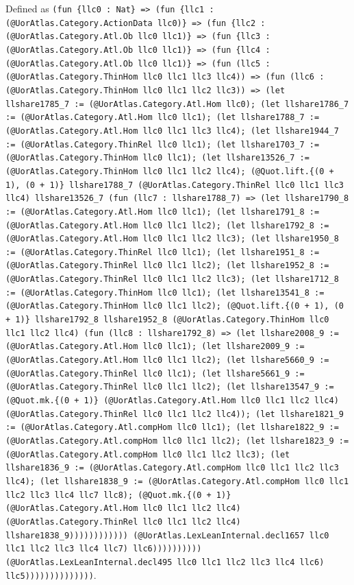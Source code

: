 \documentclass[11pt]{article}
\begin{document}
\noindent Defined as \texttt{(fun \{llc0 : Nat\} => (fun \{llc1 : (@UorAtlas.Category.ActionData llc0)\} => (fun \{llc2 : (@UorAtlas.Category.Atl.Ob llc0 llc1)\} => (fun \{llc3 : (@UorAtlas.Category.Atl.Ob llc0 llc1)\} => (fun \{llc4 : (@UorAtlas.Category.Atl.Ob llc0 llc1)\} => (fun (llc5 : (@UorAtlas.Category.ThinHom llc0 llc1 llc3 llc4)) => (fun (llc6 : (@UorAtlas.Category.ThinHom llc0 llc1 llc2 llc3)) => (let llshare1785\_7 := (@UorAtlas.Category.Atl.Hom llc0); (let llshare1786\_7 := (@UorAtlas.Category.Atl.Hom llc0 llc1); (let llshare1788\_7 := (@UorAtlas.Category.Atl.Hom llc0 llc1 llc3 llc4); (let llshare1944\_7 := (@UorAtlas.Category.ThinRel llc0 llc1); (let llshare1703\_7 := (@UorAtlas.Category.ThinHom llc0 llc1); (let llshare13526\_7 := (@UorAtlas.Category.ThinHom llc0 llc1 llc2 llc4); (@Quot.lift.\{(0 + 1), (0 + 1)\} llshare1788\_7 (@UorAtlas.Category.ThinRel llc0 llc1 llc3 llc4) llshare13526\_7 (fun (llc7 : llshare1788\_7) => (let llshare1790\_8 := (@UorAtlas.Category.Atl.Hom llc0 llc1); (let llshare1791\_8 := (@UorAtlas.Category.Atl.Hom llc0 llc1 llc2); (let llshare1792\_8 := (@UorAtlas.Category.Atl.Hom llc0 llc1 llc2 llc3); (let llshare1950\_8 := (@UorAtlas.Category.ThinRel llc0 llc1); (let llshare1951\_8 := (@UorAtlas.Category.ThinRel llc0 llc1 llc2); (let llshare1952\_8 := (@UorAtlas.Category.ThinRel llc0 llc1 llc2 llc3); (let llshare1712\_8 := (@UorAtlas.Category.ThinHom llc0 llc1); (let llshare13541\_8 := (@UorAtlas.Category.ThinHom llc0 llc1 llc2); (@Quot.lift.\{(0 + 1), (0 + 1)\} llshare1792\_8 llshare1952\_8 (@UorAtlas.Category.ThinHom llc0 llc1 llc2 llc4) (fun (llc8 : llshare1792\_8) => (let llshare2008\_9 := (@UorAtlas.Category.Atl.Hom llc0 llc1); (let llshare2009\_9 := (@UorAtlas.Category.Atl.Hom llc0 llc1 llc2); (let llshare5660\_9 := (@UorAtlas.Category.ThinRel llc0 llc1); (let llshare5661\_9 := (@UorAtlas.Category.ThinRel llc0 llc1 llc2); (let llshare13547\_9 := (@Quot.mk.\{(0 + 1)\} (@UorAtlas.Category.Atl.Hom llc0 llc1 llc2 llc4) (@UorAtlas.Category.ThinRel llc0 llc1 llc2 llc4)); (let llshare1821\_9 := (@UorAtlas.Category.Atl.compHom llc0 llc1); (let llshare1822\_9 := (@UorAtlas.Category.Atl.compHom llc0 llc1 llc2); (let llshare1823\_9 := (@UorAtlas.Category.Atl.compHom llc0 llc1 llc2 llc3); (let llshare1836\_9 := (@UorAtlas.Category.Atl.compHom llc0 llc1 llc2 llc3 llc4); (let llshare1838\_9 := (@UorAtlas.Category.Atl.compHom llc0 llc1 llc2 llc3 llc4 llc7 llc8); (@Quot.mk.\{(0 + 1)\} (@UorAtlas.Category.Atl.Hom llc0 llc1 llc2 llc4) (@UorAtlas.Category.ThinRel llc0 llc1 llc2 llc4) llshare1838\_9)))))))))))) (@UorAtlas.LexLeanInternal.decl1657 llc0 llc1 llc2 llc3 llc4 llc7) llc6)))))))))) (@UorAtlas.LexLeanInternal.decl495 llc0 llc1 llc2 llc3 llc4 llc6) llc5))))))))))))))}.\par
\end{document}
